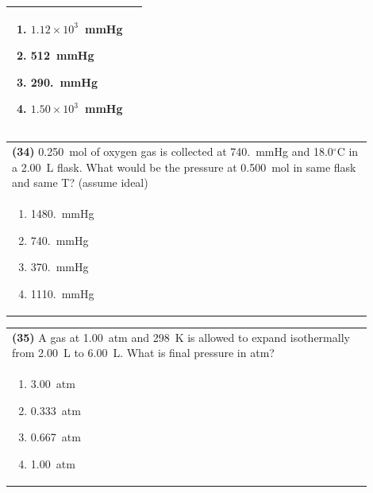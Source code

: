 \documentclass{article}
\begin{document}
{{\begin{tabular}{|p{0.9\linewidth}|}
\begin{minipage}[t]{0.85\linewidth}
\begin{enumerate}[label=\alph*.]
\item $1.12\times10^{3}$~mmHg
\item 512~mmHg
\item 290.~mmHg
\item $1.50\times10^{3}$~mmHg
\end{enumerate}
\end{minipage}\\[0.2cm]
\hline
\end{tabular}

\vspace{0.2cm}
\noindent\begin{tabular}{|p{0.9\linewidth}|}
\hline
\textbf{(34)} 0.250~mol of oxygen gas is collected at 740.~mmHg and 18.0$^\circ$C in a 2.00~L flask. What would be the pressure at 0.500~mol in same flask and same T? (assume ideal)\\[0.2cm]

\begin{minipage}[t]{0.85\linewidth}
\begin{enumerate}[label=\alph*.]
\item 1480.~mmHg
\item 740.~mmHg
\item 370.~mmHg
\item 1110.~mmHg
\end{enumerate}
\end{minipage}\\[0.2cm]
\hline
\end{tabular}

\vspace{0.2cm}
\noindent\begin{tabular}{|p{0.9\linewidth}|}
\hline
\textbf{(35)} A gas at 1.00~atm and 298~K is allowed to expand isothermally from 2.00~L to 6.00~L. What is final pressure in atm?\\[0.2cm]

\begin{minipage}[t]{0.85\linewidth}
\begin{enumerate}[label=\alph*.]
\item 3.00~atm
\item 0.333~atm
\item 0.667~atm
\item 1.00~atm
\end{enumerate}
\end{minipage}\\[0.2cm]
\hline
\end{tabular}

}}
\end{document}
